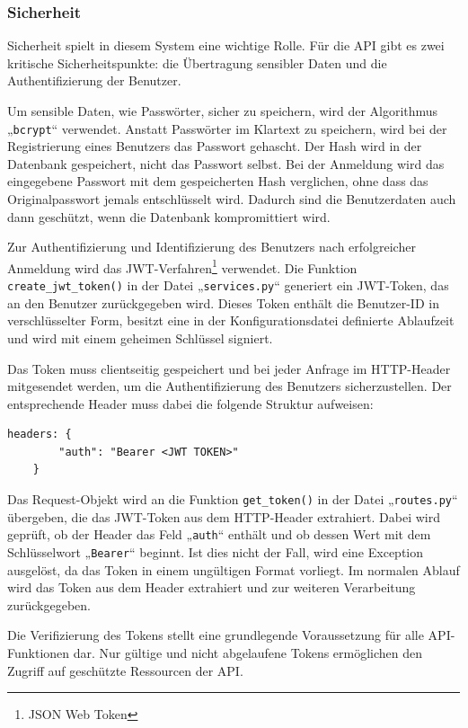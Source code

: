 \documentclass[12pt, letterpaper]{article}
\begin{document}
  \subsubsection{Sicherheit}
  \par \textbf{}
  \par Sicherheit spielt in diesem System eine wichtige Rolle. Für die API gibt es zwei kritische Sicherheitspunkte: die Übertragung sensibler Daten und die Authentifizierung der Benutzer.
  \par Um sensible Daten, wie Passwörter, sicher zu speichern, wird der Algorithmus „\texttt{bcrypt}“ verwendet. Anstatt Passwörter im Klartext zu speichern, wird bei der Registrierung eines Benutzers das Passwort gehascht. Der Hash wird in der Datenbank gespeichert, nicht das Passwort selbst. Bei der Anmeldung wird das eingegebene Passwort mit dem gespeicherten Hash verglichen, ohne dass das Originalpasswort jemals entschlüsselt wird. Dadurch sind die Benutzerdaten auch dann geschützt, wenn die Datenbank kompromittiert wird.
  \par Zur Authentifizierung und Identifizierung des Benutzers nach erfolgreicher Anmeldung wird das JWT-Verfahren\footnote{JSON Web Token} verwendet. Die Funktion \texttt{create\_jwt\_token()} in der Datei „\texttt{services.py}“ generiert ein JWT-Token, das an den Benutzer zurückgegeben wird. Dieses Token enthält die Benutzer-ID in verschlüsselter Form, besitzt eine in der Konfigurationsdatei definierte Ablaufzeit und wird mit einem geheimen Schlüssel signiert.
  \par Das Token muss clientseitig gespeichert und bei jeder Anfrage im HTTP-Header mitgesendet werden, um die Authentifizierung des Benutzers sicherzustellen. Der entsprechende Header muss dabei die folgende Struktur aufweisen:
  \begin{Verbatim}[frame=single]
    headers: {
        "auth": "Bearer <JWT TOKEN>"
    }
  \end{Verbatim}
  \par Das Request-Objekt wird an die Funktion \texttt{get\_token()} in der Datei „\texttt{routes.py}“ übergeben, die das JWT-Token aus dem HTTP-Header extrahiert. Dabei wird geprüft, ob der Header das Feld „\texttt{auth}“ enthält und ob dessen Wert mit dem Schlüsselwort „\texttt{Bearer}“ beginnt. Ist dies nicht der Fall, wird eine Exception ausgelöst, da das Token in einem ungültigen Format vorliegt. Im normalen Ablauf wird das Token aus dem Header extrahiert und zur weiteren Verarbeitung zurückgegeben.
  \par Die Verifizierung des Tokens stellt eine grundlegende Voraussetzung für alle API-Funktionen dar. Nur gültige und nicht abgelaufene Tokens ermöglichen den Zugriff auf geschützte Ressourcen der API.
\end{document}
